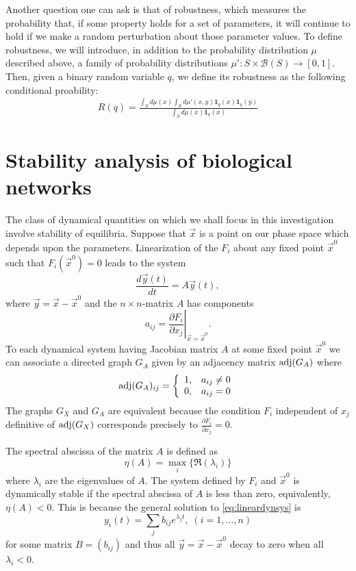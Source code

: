 Another question one can ask is that of robustness, which measures the
probability that, if some property holds for a set of parameters, it will
continue to hold if we make a random perturbation about those parameter values.
To define robustness, we will introduce, in addition to the probability
distribution $\mu$ described above, a family of probability distributions
$\mu' \colon S \times \mathcal{B}(S) \to [0,1]$.  Then, given a binary random
variable $q$, we define its robustness as the following conditional proability:
\begin{align}\label{eq:robustness}
  R (q) =
  \frac{\int_S d\mu(x) \int_S d\mu'(x,y) \mathbf{1}_q(x) \mathbf{1}_q(y)}
  {\int_S d\mu(x) \mathbf{1}_q(x)}
\end{align}

\section{Stability analysis of biological networks}
The class of dynamical quantities on which we shall focus in this investigation involve stability of equilibria.  Suppose that $\vec x$ is a point on our phase space which depends upon the parameters.  Linearization of the $F_i$ about any fixed point $\vec{x}^0$ such that $F_i(\vec{x}^0)=0$ leads to the system
\begin{equation}\label{eq:lineardynsys}
\frac{d\vec{y}(t)}{dt} = A \vec{y}(t),
\end{equation}
where $\vec{y} = \vec{x} - \vec{x}^0$ and the $n \times n$-matrix $A$ has components
$$
a_{ij} = \left. \frac{\partial F_i}{\partial x_j} \right|_{\vec{x} = \vec{x}^0}.
$$
To each dynamical system having Jacobian matrix $A$ at some fixed point $\vec{x}^0$ we can associate a directed graph $G_A$ given by an adjacency matrix $\mathrm{adj}(G_A)$ where
 \begin{displaymath}
   \mathrm{adj}(G_A)_{ij} = \left\{
     \begin{array}{lr}
       1, & a_{ij} \neq 0\\
       0, & a_{ij} = 0
     \end{array}
   \right.
\end{displaymath}
The graphs $G_X$ and $G_A$ are equivalent because the condition $F_i$ independent of $x_j$ definitive of $\mathrm{adj}(G_X)$ corresponds precisely to $\frac{\partial F_i}{\partial x_j}=0$.

The spectral abscissa of the matrix $A$ is defined as
$$
\eta(A) = \max_i \{\Re(\lambda_i)\}
$$
where $\lambda_i$ are the eigenvalues of $A$. The system defined by $F_i$ and $\vec{x}^0$ is dynamically stable if the spectral abscissa of $A$ is less than zero, equivalently, $\eta(A) < 0$. This is because the general solution to \ref{eq:lineardynsys} is
$$
y_i(t) = \sum_j b_{ij} e^{\lambda_j t}, \; (i=1,\ldots,n)
$$
for some matrix $B=(b_{ij})$ and thus all $\vec{y} = \vec{x} - \vec{x}^0$ decay to zero when all $\lambda_i < 0$.

